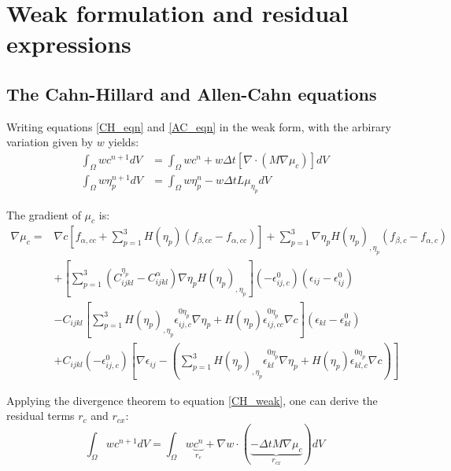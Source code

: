 \documentclass[11pt]{article}
\renewcommand{\=}[1]{\stackrel{#1}{=}} %
\theoremstyle{definition}
\theoremstyle{remark}
\begin{document}
\section{Weak formulation and residual expressions}
\subsection{The Cahn-Hillard and Allen-Cahn equations}
Writing equations \ref{CH_eqn} and \ref{AC_eqn} in the weak form, with the arbirary variation given by $w$ yields:
\begin{align}
\int_\Omega w c^{n+1} dV &= \int_\Omega wc^{n}+w  \Delta t [\nabla \cdot (M \nabla \mu_c) ] dV \label{CH_weak} \\
\int_\Omega w \eta_p^{n+1} dV &= \int_\Omega w \eta_p^{n}-w  \Delta t L \mu_{\eta_p} dV  \label{AC_weak}
\end{align}

The gradient of $\mu_c$ is:
\begin{equation}
\begin{split}
\nabla \mu_c = & \nabla c \left[f_{\alpha,cc}+ \sum_{p=1}^3 H(\eta_p)(f_{\beta,cc}-f_{\alpha,cc}) \right]+ \sum_{p=1}^3 \nabla \eta_p H(\eta_p)_{,\eta_p} (f_{\beta,c}-f_{\alpha,c}) \\
&+ \left[ \sum_{p=1}^3 (C_{ijkl}^{\eta_p} - C_{ijkl}^{\alpha} )\nabla \eta_p H(\eta_p)_{,\eta_p} \right](-\epsilon_{ij,c}^0)(\epsilon_{ij} - \epsilon_{ij}^0) \\
&- C_{ijkl} \left[  \sum_{p=1}^3 H(\eta_p)_{,\eta_p} \epsilon_{ij,c}^{0\eta_p} \nabla \eta_p + H(\eta_p) \epsilon_{ij,cc}^{0\eta_p} \nabla c \right](\epsilon_{kl}-\epsilon_{kl}^0)\\
&+ C_{ijkl} (-\epsilon_{ij,c}^0) \left[ \nabla \epsilon_{ij} -  \left( \sum_{p=1}^3 H(\eta_p)_{,\eta_p} \epsilon_{kl}^{0\eta_p} \nabla \eta_p + H(\eta_p) \epsilon_{kl,c}^{0\eta_p} \nabla c \right) \right]
\end{split}
\end{equation}

Applying the divergence theorem to equation \ref{CH_weak}, one can derive the residual terms $r_c$ and $r_{cx}$:
\begin{equation}
\int_\Omega w c^{n+1} dV = \int_\Omega w\underbrace{c^{n}}_{r_c}+\nabla w \cdot (\underbrace{-\Delta t  M \nabla \mu_c}_{r_{cx}} ) dV
\end{equation}
\end{document}
